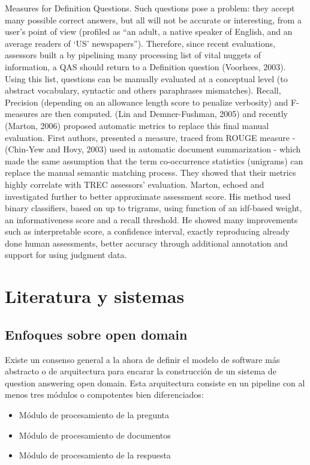 Measures for Definition Questions. Such questions pose 
a problem: they accept many possible correct answers, but all 
will not be accurate or interesting, from a user’s point of 
view (profiled as “an adult, a native speaker of English, and 
an average readers of ‘US’ newspapers”). Therefore, since 
recent evaluations, assessors built a by pipelining many 
processing list of vital nuggets of information, a QAS should 
return to a Definition question (Voorhees, 2003). Using this 
list, questions can be manually evaluated at a conceptual 
level (to abstract vocabulary, syntactic and others paraphrases 
mismatches). Recall, Precision (depending on an allowance 
length score to penalize verbosity) and F-measures are then 
computed. 
(Lin and Demner-Fushman, 2005) and recently (Marton, 
2006) proposed automatic metrics to replace this final 
manual evaluation. First authors, presented a measure, traced 
from ROUGE measure - (Chin-Yew and Hovy, 2003) used in 
automatic document summarization - which made the same 
assumption that the term co-occurrence statistics (unigrams) 
can replace the manual semantic matching process. They 
showed that their metrics highly correlate with TREC 
assessors’ evaluation. Marton, echoed and investigated 
further to better approximate assessment score. His method 
used binary classifiers, based on up to trigrams, using 
function of an idf-based weight, an informativeness score and 
a recall threshold. He showed many improvements such as 
interpretable score, a confidence interval, exactly reproducing 
already done human assessments, better accuracy through 
additional annotation and support for using judgment data.

\section{Literatura y sistemas}
\label{sec:literatura}
\subsection{Enfoques sobre open domain}
\label{subsec:open-domain}

Existe un consenso general a la ahora de definir el modelo de software más abstracto o de arquitectura para encarar la construcción de un sistema de question answering open domain. Esta arquitectura consiste en un pipeline con al menos tres módulos o compotentes bien diferenciados:
\begin{itemize}
\item Módulo de procesamiento de la pregunta
\item Módulo de procesamiento de documentos
\item Módulo de procesamiento de la respuesta
\end{itemize}

